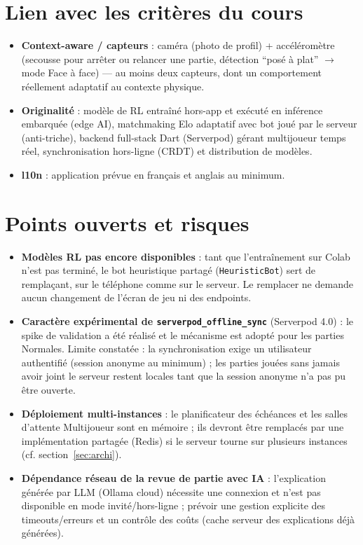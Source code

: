 \documentclass[a4paper,11pt]{article}
\begin{document}
\section{Lien avec les critères du cours}

\begin{itemize}[leftmargin=1.5em]
  \item \textbf{Context-aware / capteurs} : caméra (photo de profil) + accéléromètre
        (secousse pour arrêter ou relancer une partie, détection ``posé à
        plat'' $\rightarrow$ mode Face à face) --- au moins deux capteurs, dont un comportement réellement
        adaptatif au contexte physique.
  \item \textbf{Originalité} : modèle de RL entraîné hors-app et exécuté en
        inférence embarquée (edge AI), matchmaking Elo adaptatif avec bot joué par
        le serveur (anti-triche), backend full-stack Dart (Serverpod) gérant
        multijoueur temps réel, synchronisation hors-ligne (CRDT) et distribution
        de modèles.
  \item \textbf{l10n} : application prévue en français et anglais au minimum.
\end{itemize}

\section{Points ouverts et risques}
\label{sec:risques}

\begin{itemize}[leftmargin=1.5em]
  \item \textbf{Modèles RL pas encore disponibles} : tant que l'entraînement sur Colab
        n'est pas terminé, le bot heuristique partagé (\texttt{HeuristicBot}) sert de
        remplaçant, sur le téléphone comme sur le serveur. Le remplacer ne demande
        aucun changement de l'écran de jeu ni des endpoints.
  \item \textbf{Caractère expérimental de \texttt{serverpod\_offline\_sync}}
        (Serverpod 4.0) : le spike de validation a été réalisé et le mécanisme est
        adopté pour les parties Normales. Limite constatée : la synchronisation
        exige un utilisateur authentifié (session anonyme au minimum) ; les
        parties jouées sans jamais avoir joint le serveur restent locales tant
        que la session anonyme n'a pas pu être ouverte.
  \item \textbf{Déploiement multi-instances} : le planificateur des échéances et les
        salles d'attente Multijoueur sont en mémoire ; ils devront être remplacés par
        une implémentation partagée (Redis) si le serveur tourne sur plusieurs
        instances (cf. section~\ref{sec:archi}).
  \item \textbf{Dépendance réseau de la revue de partie avec IA} : l'explication
        générée par LLM (Ollama cloud) nécessite une connexion et n'est pas
        disponible en mode invité/hors-ligne ; prévoir une gestion explicite des
        timeouts/erreurs et un contrôle des coûts (cache serveur des explications déjà
        générées).
\end{itemize}
\end{document}
